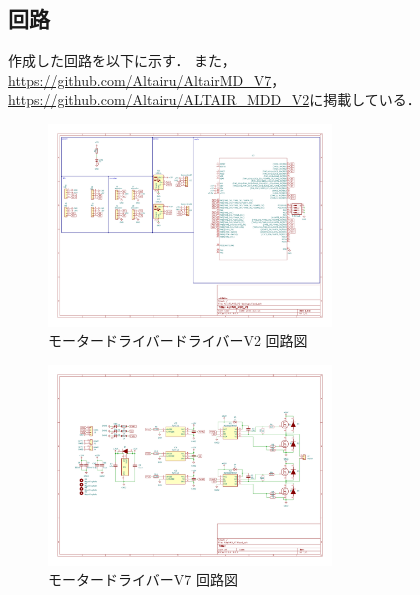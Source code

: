 \newpage
\subsection{回路}
作成した回路を以下に示す．
また，\url{https://github.com/Altairu/AltairMD_V7}，
\url{https://github.com/Altairu/ALTAIR_MDD_V2}に掲載している．

\begin{figure}[h]
    \centering
    \includegraphics[width=0.67\textwidth]{figure/MDDv2.pdf}
    \caption{モータードライバードライバーV2 回路図}
\end{figure}

\begin{figure}[h]
    \centering
    \includegraphics[width=0.67\textwidth]{figure/MDV7.pdf}
    \caption{モータードライバーV7 回路図}
\end{figure}